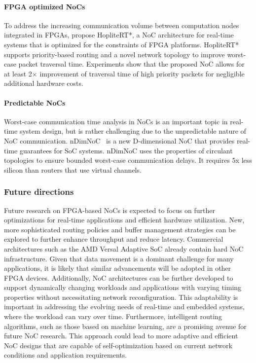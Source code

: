 \paragraph{FPGA optimized NoCs} To address the increasing communication volume between computation nodes integrated in FPGAs,  \citet{HopliteRT*} propose
HopliteRT*, %
a NoC architecture for real-time systems that is optimized for the constraints of FPGA platforms. HopliteRT* supports priority-based routing and a novel network topology to improve worst-case packet traversal time. Experiments show that the proposed NoC allows for at least 2\(\times\) improvement of traversal time of high priority packets for negligible additional hardware costs.
\paragraph{Predictable NoCs} Worst-case communication time analysis in NoCs is an important topic in real-time system design, but is rather challenging due to the unpredictable nature of NoC communication. nDimNoC~\cite{nDimNoC} is a new D-dimensional NoC that provides real-time guarantees for SoC systems. nDimNoC uses the properties of circulant topologies to ensure bounded worst-case communication delays. It requires 5x less silicon than routers that use virtual channels.


\subsubsection*{\bf{Future directions}} 
Future research on FPGA-based NoCs is expected to focus on further optimizations for real-time applications and efficient hardware utilization. New, more sophisticated routing policies and buffer management strategies can be explored to further enhance throughput and reduce latency. Commercial architectures such as the AMD Versal Adaptive SoC already contain hard NoC infrastructure. 
Given that data movement is a dominant challenge for many applications, it is likely that similar advancements will be adopted in other FPGA devices. Additionally, NoC architectures can be further developed to support dynamically changing workloads and applications with varying timing properties without necessitating network reconfiguration. This adaptability is important in addressing the evolving needs of real-time and embedded systems, where the workload can vary over time. Furthermore, intelligent routing algorithms, such as those based on machine learning, are a promising avenue for future NoC research. This approach could lead to more adaptive and efficient NoC designs that are capable of self-optimization based on current network conditions and application requirements. 
